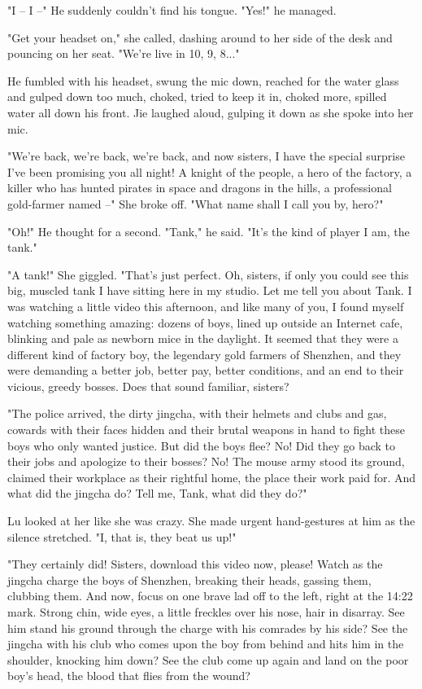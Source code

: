 "I -- I --" He suddenly couldn't find his tongue. "Yes!" he
managed.

"Get your headset on," she called, dashing around to her side of
the desk and pouncing on her seat. "We're live in 10, 9, 8..."

He fumbled with his headset, swung the mic down, reached for the
water glass and gulped down too much, choked, tried to keep it in,
choked more, spilled water all down his front. Jie laughed aloud,
gulping it down as she spoke into her mic.

"We're back, we're back, we're back, and now sisters, I have the
special surprise I've been promising you all night! A knight of the
people, a hero of the factory, a killer who has hunted pirates in
space and dragons in the hills, a professional gold-farmer named
--" She broke off. "What name shall I call you by, hero?"

"Oh!" He thought for a second. "Tank," he said. "It's the kind of
player I am, the tank."

"A tank!" She giggled. "That's just perfect. Oh, sisters, if only
you could see this big, muscled tank I have sitting here in my
studio. Let me tell you about Tank. I was watching a little video
this afternoon, and like many of you, I found myself watching
something amazing: dozens of boys, lined up outside an Internet
cafe, blinking and pale as newborn mice in the daylight. It seemed
that they were a different kind of factory boy, the legendary gold
farmers of Shenzhen, and they were demanding a better job, better
pay, better conditions, and an end to their vicious, greedy bosses.
Does that sound familiar, sisters?

"The police arrived, the dirty jingcha, with their helmets and
clubs and gas, cowards with their faces hidden and their brutal
weapons in hand to fight these boys who only wanted justice. But
did the boys flee? No! Did they go back to their jobs and apologize
to their bosses? No! The mouse army stood its ground, claimed their
workplace as their rightful home, the place their work paid for.
And what did the jingcha do? Tell me, Tank, what did they do?"

Lu looked at her like she was crazy. She made urgent hand-gestures
at him as the silence stretched. "I, that is, they beat us up!"

"They certainly did! Sisters, download this video now, please!
Watch as the jingcha charge the boys of Shenzhen, breaking their
heads, gassing them, clubbing them. And now, focus on one brave lad
off to the left, right at the 14:22 mark. Strong chin, wide eyes, a
little freckles over his nose, hair in disarray. See him stand his
ground through the charge with his comrades by his side? See the
jingcha with his club who comes upon the boy from behind and hits
him in the shoulder, knocking him down? See the club come up again
and land on the poor boy's head, the blood that flies from the
wound?

